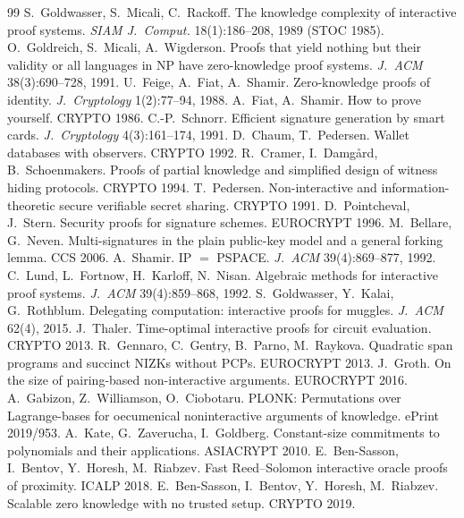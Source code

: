 \documentclass[11pt,a4paper]{report}
\theoremstyle{plain}
\theoremstyle{definition}
\theoremstyle{remark}
\begin{document}
\begin{thebibliography}{99}
 S.\ Goldwasser, S.\ Micali, C.\ Rackoff. The knowledge complexity of interactive proof systems. \emph{SIAM J.\ Comput.} 18(1):186--208, 1989 (STOC 1985).
 O.\ Goldreich, S.\ Micali, A.\ Wigderson. Proofs that yield nothing but their validity or all languages in NP have zero-knowledge proof systems. \emph{J.\ ACM} 38(3):690--728, 1991.
 U.\ Feige, A.\ Fiat, A.\ Shamir. Zero-knowledge proofs of identity. \emph{J.\ Cryptology} 1(2):77--94, 1988.
 A.\ Fiat, A.\ Shamir. How to prove yourself. CRYPTO 1986.
 C.-P.\ Schnorr. Efficient signature generation by smart cards. \emph{J.\ Cryptology} 4(3):161--174, 1991.
 D.\ Chaum, T.\ Pedersen. Wallet databases with observers. CRYPTO 1992.
 R.\ Cramer, I.\ Damgård, B.\ Schoenmakers. Proofs of partial knowledge and simplified design of witness hiding protocols. CRYPTO 1994.
 T.\ Pedersen. Non-interactive and information-theoretic secure verifiable secret sharing. CRYPTO 1991.
 D.\ Pointcheval, J.\ Stern. Security proofs for signature schemes. EUROCRYPT 1996.
 M.\ Bellare, G.\ Neven. Multi-signatures in the plain public-key model and a general forking lemma. CCS 2006.
 A.\ Shamir. IP $=$ PSPACE. \emph{J.\ ACM} 39(4):869--877, 1992.
 C.\ Lund, L.\ Fortnow, H.\ Karloff, N.\ Nisan. Algebraic methods for interactive proof systems. \emph{J.\ ACM} 39(4):859--868, 1992.
 S.\ Goldwasser, Y.\ Kalai, G.\ Rothblum. Delegating computation: interactive proofs for muggles. \emph{J.\ ACM} 62(4), 2015.
 J.\ Thaler. Time-optimal interactive proofs for circuit evaluation. CRYPTO 2013.
 R.\ Gennaro, C.\ Gentry, B.\ Parno, M.\ Raykova. Quadratic span programs and succinct NIZKs without PCPs. EUROCRYPT 2013.
 J.\ Groth. On the size of pairing-based non-interactive arguments. EUROCRYPT 2016.
 A.\ Gabizon, Z.\ Williamson, O.\ Ciobotaru. PLONK: Permutations over Lagrange-bases for oecumenical noninteractive arguments of knowledge. ePrint 2019/953.
 A.\ Kate, G.\ Zaverucha, I.\ Goldberg. Constant-size commitments to polynomials and their applications. ASIACRYPT 2010.
 E.\ Ben-Sasson, I.\ Bentov, Y.\ Horesh, M.\ Riabzev. Fast Reed--Solomon interactive oracle proofs of proximity. ICALP 2018.
 E.\ Ben-Sasson, I.\ Bentov, Y.\ Horesh, M.\ Riabzev. Scalable zero knowledge with no trusted setup. CRYPTO 2019.

\end{thebibliography}
\end{document}
